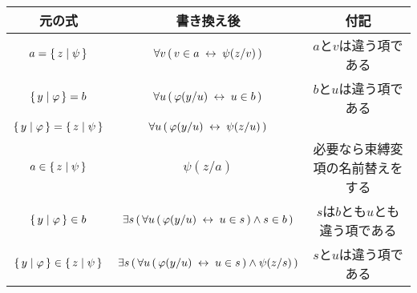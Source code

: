 	\begin{table}[H]
		\begin{center}
		\begin{tabular}{c|c|c}
			元の式 & 書き換え後 & 付記 \\ \hline \hline
			$a = \{\, z \mid \psi\, \}$ & $\forall v\, (\, v \in a \hspace{0.25em}\leftrightarrow\hspace{0.25em} \psi(z/v)\, )$ & $a$と$v$は違う項である \\ \hline
			$\{\, y \mid \varphi\, \} = b$ & $\forall u\, (\, \varphi(y/u) \hspace{0.25em}\leftrightarrow\hspace{0.25em} u \in b\, )$ & $b$と$u$は違う項である \\ \hline
			$\{\, y \mid \varphi\, \} = \{\, z \mid \psi\, \}$ & $\forall u\, (\, \varphi(y/u) \hspace{0.25em}\leftrightarrow\hspace{0.25em} \psi(z/u)\, )$ & \\ \hline
			$a \in \{\, z \mid \psi\, \}$ & $\psi(z/a)$ & 必要なら束縛変項の名前替えをする \\ \hline
			$\{\, y \mid \varphi\, \} \in b$ & $\exists s\, (\, \forall u\, (\, \varphi(y/u) \hspace{0.25em}\leftrightarrow\hspace{0.25em} u \in s\, ) \wedge s \in b\, )$ & $s$は$b$とも$u$とも違う項である \\ \hline
			$\{\, y \mid \varphi\, \} \in \{\, z \mid \psi\, \}$ & $\exists s\, (\, \forall u\, (\, \varphi(y/u) \hspace{0.25em}\leftrightarrow\hspace{0.25em} u \in s\, ) \wedge \psi(z/s)\, )$ & $s$と$u$は違う項である \\ \hline
		\end{tabular}
		\end{center}
	\end{table}
	
